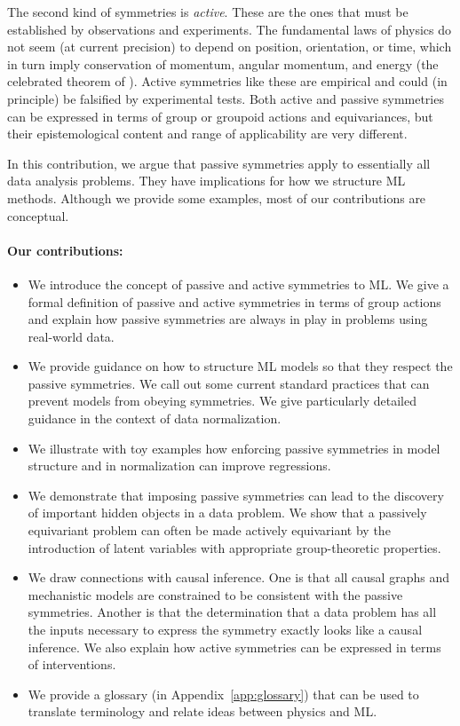 \documentclass[accepted]{article}
\newcommand{\appref}[1]{Appendix~\ref{#1}}
\begin{document}
The second kind of symmetries is \emph{active}.
These are the ones that must be established by observations and experiments.
The fundamental laws of physics do not seem (at current precision) to depend on position, orientation, or time, which in turn imply conservation of momentum, angular momentum, and energy (the celebrated theorem of \citealt{noether}).
Active symmetries like these are empirical and could (in principle) be falsified by experimental tests.
Both active and passive symmetries can be expressed in terms of group or groupoid actions and equivariances, but their epistemological content and range of applicability are very different. 

In this contribution, we argue that passive symmetries apply to essentially all data analysis problems.
They have implications for how we structure ML methods.
Although we provide some examples, most of our contributions are conceptual.

\paragraph{Our contributions:}
\begin{itemize}
\item
We introduce the concept of passive and active symmetries to ML.
We give a formal definition of passive and active symmetries in terms of group actions and explain how passive symmetries are always in play in problems using real-world data.
\item 
We provide guidance on how to structure ML models so that they respect the passive symmetries.
We call out some current standard practices that can prevent models from obeying symmetries.
We give particularly detailed guidance in the context of data normalization.
\item
We illustrate with toy examples how enforcing passive symmetries in model structure and in normalization can improve regressions. 
\item
We demonstrate that imposing passive symmetries can lead to the discovery of important hidden objects in a data problem.
We show that a passively equivariant problem can often be made actively equivariant by the introduction of latent variables with appropriate group-theoretic properties.
\item
We draw connections with causal inference.
One is that all causal graphs and mechanistic models are constrained to be consistent with the passive symmetries.
Another is that the determination that a data problem has all the inputs necessary to express the symmetry exactly looks like a causal inference. 
We also explain how active symmetries can be expressed in terms of interventions.
\item
We provide a glossary (in \appref{app:glossary}) that can be used to translate terminology and relate ideas between physics and ML. 
\end{itemize}
\end{document}
